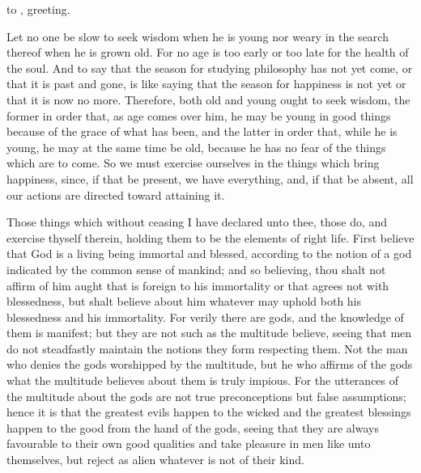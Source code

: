 \documentclass{stex}
\begin{document}


\noindent {} to , greeting.

\vspace{1em}
Let no one be slow to seek wisdom when he is young nor weary in the search thereof when he is grown old.
For no age is too early or too late for the health of the soul.
And to say that the season for studying philosophy has not yet come, or that it is past and gone, is like saying that the season for happiness is not yet or that it is now no more.
Therefore, both old and young ought to seek wisdom, the former in order that, as age comes over him, he may be young in good things because of the grace of what has been, and the latter in order that, while he is young, he may at the same time be old, because he has no fear of the things which are to come.
So we must exercise ourselves in the things which bring happiness, since, if that be present, we have everything, and, if that be absent, all our actions are directed toward attaining it.

Those things which without ceasing I have declared unto thee, those do, and exercise thyself therein, holding them to be the elements of right life.
First believe that God is a living being immortal and blessed, according to the notion of a god indicated by the common sense of mankind; and so believing, thou shalt not affirm of him aught that is foreign to his immortality or that agrees not with blessedness, but shalt believe about him whatever may uphold both his blessedness and his immortality.
For verily there are gods, and the knowledge of them is manifest; but they are not such as the multitude believe, seeing that men do not steadfastly maintain the notions they form respecting them.
Not the man who denies the gods worshipped by the multitude, but he who affirms of the gods what the multitude believes about them is truly impious.
For the utterances of the multitude about the gods are not true preconceptions but false assumptions; hence it is that the greatest evils happen to the wicked and the greatest blessings happen to the good from the hand of the gods, seeing that they are always favourable to their own good qualities and take pleasure in men like unto themselves, but reject as alien whatever is not of their kind.
\end{document}
